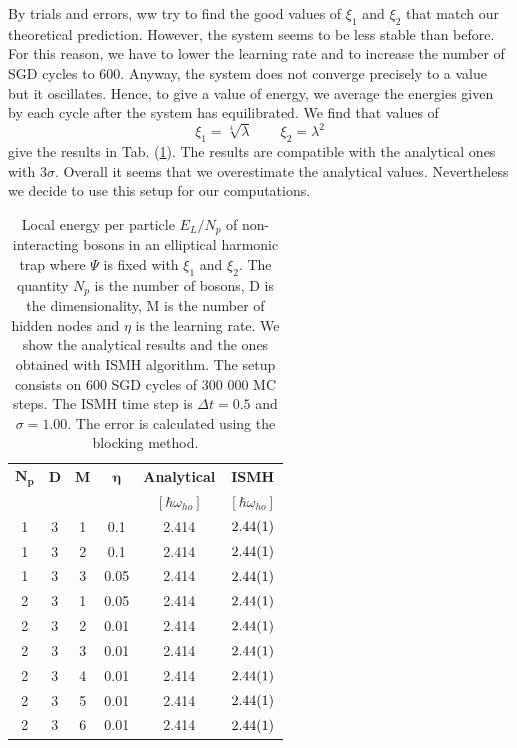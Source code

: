 By trials and errors, ww try to find the good values of $\xi_1$ and $\xi_2$ that match our theoretical prediction. However, the system seems to be less stable than before. For this reason, we have to lower the learning rate and to increase the number of SGD cycles to 600. Anyway, the system does not converge precisely to a value but it oscillates. Hence, to give a value of energy, we average the energies given by each cycle after the system has equilibrated. We find that values of 
\begin{equation*}
	\xi_1=\sqrt[4]{\lambda}\qquad \xi_2=\lambda^2
\end{equation*}
give the results in Tab. (\ref{Tab:3.3}). The results are compatible with the analytical ones with $3\sigma$. Overall it seems that we overestimate the analytical values. Nevertheless we decide to use this setup for our computations.  

\begin{table}[H]
	\centering
	\caption{Local energy per particle $E_L/N_p$ of non-interacting bosons in an elliptical harmonic trap where $\Psi$ is fixed with $\xi_1$ and $\xi_2$. The quantity $N_p$ is the number of bosons, D is the dimensionality, M is the number of hidden nodes and $\eta$ is the learning rate. We show the analytical results and the ones obtained with ISMH algorithm. The setup consists on 600 SGD cycles of 300 000 MC steps. The ISMH time step is $\Delta t = 0.5$ and $\sigma = 1.00$.  The error is calculated using the blocking method.}
	\begin{tabular}{c c c c |c  c} 
		$\boldsymbol{N_p}$ & \textbf{D}  & $\boldsymbol{M}$ & $\boldsymbol{\eta}$ & \textbf{Analytical} &\textbf{ISMH} \\
		&&&&$[\hbar\omega_{ho}]$ &$[\hbar\omega_{ho}]$\\\hline
		1 & 3 & 1 &0.1 &           2.414                &        $\SI{2.44\pm 0.01}{}$                \\
		1 & 3 & 2 &0.1 &           2.414                 &     $\SI{2.44\pm 0.01}{}$                   \\
		1 & 3 & 3 &0.05 &           2.414                 &     $\SI{2.44\pm 0.01}{}$                   \\ \hline
		2 & 3 & 1 &0.05 &           2.414                 &     $\SI{2.44\pm 0.01}{}$                   \\
		2 & 3 & 2 &0.01 &           2.414                 &     $\SI{2.44\pm 0.01}{}$                   \\
		2 & 3 & 3 &0.01 &           2.414                 &      $\SI{2.44\pm 0.01}{}$                  \\
		2 & 3 & 4 &0.01 &           2.414                 &     $\SI{2.44\pm 0.01}{}$                   \\
		2 & 3 & 5 &0.01 &            2.414                &  $\SI{2.44\pm 0.01}{}$                            \\
		2 & 3 & 6 &0.01 &           2.414                 &   $\SI{2.44\pm 0.01}{}$                           \\ 
	\end{tabular}
	\label{Tab:3.3}
\end{table} 